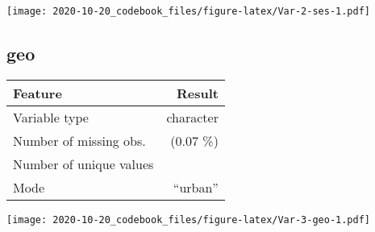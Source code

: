 \documentclass[]{article}
\begin{document}
\begin{minipage}{0.25 \textwidth}

\texttt{[image: 2020-10-20\_codebook\_files/figure-latex/Var-2-ses-1.pdf]}

\end{minipage}

\noindent\makebox[\linewidth]{\rule{\textwidth}{0.4pt}}

\hypertarget{geo}{%
\subsection{geo}\label{geo}}

\begin{minipage}{0.75 \textwidth}

\begin{longtable}[]{@{}lr@{}}
\toprule
\begin{minipage}[b]{0.34\columnwidth}\raggedright
Feature\strut
\end{minipage} & \begin{minipage}[b]{0.17\columnwidth}\raggedleft
Result\strut
\end{minipage}\tabularnewline
\midrule
\endhead
\begin{minipage}[t]{0.34\columnwidth}\raggedright
Variable type\strut
\end{minipage} & \begin{minipage}[t]{0.17\columnwidth}\raggedleft
character\strut
\end{minipage}\tabularnewline
\begin{minipage}[t]{0.34\columnwidth}\raggedright
Number of missing obs.\strut
\end{minipage} & \begin{minipage}[t]{0.17\columnwidth}\raggedleft
4 (0.07 \%)\strut
\end{minipage}\tabularnewline
\begin{minipage}[t]{0.34\columnwidth}\raggedright
Number of unique values\strut
\end{minipage} & \begin{minipage}[t]{0.17\columnwidth}\raggedleft
2\strut
\end{minipage}\tabularnewline
\begin{minipage}[t]{0.34\columnwidth}\raggedright
Mode\strut
\end{minipage} & \begin{minipage}[t]{0.17\columnwidth}\raggedleft
``urban''\strut
\end{minipage}\tabularnewline
\bottomrule
\end{longtable}

\end{minipage}
\begin{minipage}{0.25 \textwidth}

\texttt{[image: 2020-10-20\_codebook\_files/figure-latex/Var-3-geo-1.pdf]}

\end{minipage}
\end{document}
